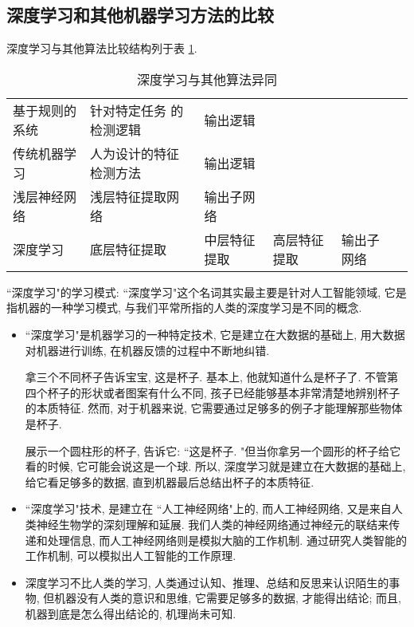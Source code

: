 \subsection{深度学习和其他机器学习方法的比较}
深度学习与其他算法比较结构列于表 \ref{DNNVSOtherNN}.
\begin{table}[!tb]
\vspace{-0.3cm}
\begin{center}
\caption{深度学习与其他算法异同}
\begin{tabular}{llllll}
\toprule
基于规则的系统    & 针对特定任务 的检测逻辑   &输出逻辑\\
传统机器学习        &人为设计的特征检测方法       &输出逻辑\\
浅层神经网络        & 浅层特征提取网络                 &输出子网络\\
深度学习                &底层特征提取                             &中层特征提取  & 高层特征提取  &输出子网络\\
\toprule
\end{tabular}
\label{DNNVSOtherNN}
\end{center}
\vspace{-0.4cm}
\end{table}

 ``深度学习"的学习模式: ``深度学习"这个名词其实最主要是针对人工智能领域, 它是指机器的一种学习模式, 与我们平常所指的人类的深度学习是不同的概念.
\begin{itemize}
    \item  ``深度学习"是机器学习的一种特定技术, 它是建立在大数据的基础上, 用大数据对机器进行训练, 在机器反馈的过程中不断地纠错.
    \begin{example}
        拿三个不同杯子告诉宝宝, 这是杯子.
    基本上, 他就知道什么是杯子了. 不管第四个杯子的形状或者图案有什么不同, 孩子已经能够基本非常清楚地辨别杯子的本质特征.
    然而, 对于机器来说, 它需要通过足够多的例子才能理解那些物体是杯子.
    \end{example}
    \begin{example}
        展示一个圆柱形的杯子, 告诉它: ``这是杯子. "但当你拿另一个圆形的杯子给它看的时候, 它可能会说这是一个球.
    所以, 深度学习就是建立在大数据的基础上, 给它看足够多的数据, 直到机器最后总结出杯子的本质特征.
    \end{example}
    \item  ``深度学习"技术, 是建立在 ``人工神经网络"上的, 而人工神经网络, 又是来自人类神经生物学的深刻理解和延展.
        我们人类的神经网络通过神经元的联结来传递和处理信息, 而人工神经网络则是模拟大脑的工作机制.
    通过研究人类智能的工作机制, 可以模拟出人工智能的工作原理.

    \item 深度学习不比人类的学习, 人类通过认知、推理、总结和反思来认识陌生的事物, 但机器没有人类的意识和思维, 它需要足够多的数据, 才能得出结论; 而且, 机器到底是怎么得出结论的, 机理尚未可知.
\end{itemize}

